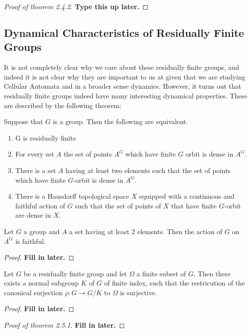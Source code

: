 \begin{proof}[Proof of theorem 2.4.2]
  \textbf{Type this up later.}
\end{proof}

\subsection{Dynamical Characteristics of Residually Finite Groups}
It is not completely clear why we care about these residually finite groups, and 
indeed it is not clear why they are important to us at given that we are studying 
Cellular Automata and in a broader sense dynamics. However, it turns out that 
residually finite groups indeed have many interesting dynamical properties. These 
are described by the following theorem:

\begin{thm}
  Suppose that $G$ is a group. Then the following are equivalent.
  \begin{enumerate}
    \item G is residually finite
    \item For every set $A$ the set of points $A^{G}$ which have finite $G$ 
      orbit is dense in $A^{G}$.
    \item There is a set $A$ having at least two elements such that the set of
      points which have finite $G$-orbit is dense in $A^{G}$.
    \item There is a Hausdorff topological space $X$ equipped with a continuous
      and faithful action of $G$ such that the set of points of $X$ that have
      finite $G$-orbit are dense in $X$.
  \end{enumerate}
\end{thm}

\begin{lemma}
  Let $G$ a group and $A$ a set having at least 2 elements. Then the action
  of $G$ on $A^{G}$ is faithful.
\end{lemma}
\begin{proof}
  \textbf{Fill in later.}
\end{proof}

\begin{lemma}
  Let $G$ be a residually finite group and let $\Omega$ a finite subset of
  $G$. Then there exists a normal subgroup $K$ of $G$ of finite index, such
  that the restricution of the canonical surjection $\rho: G \to G / K$ to
  $\Omega$ is surjective.
\end{lemma}
\begin{proof}
  \textbf{Fill in later.}
\end{proof}

\begin{proof}[Proof of theorem 2.5.1]
 \textbf{Fill in later.} 
\end{proof}



